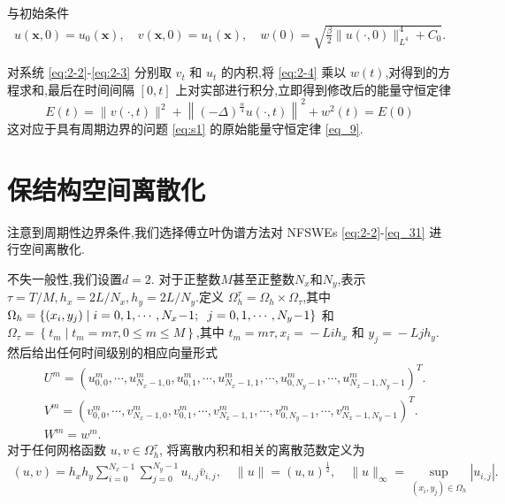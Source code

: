 与初始条件
\begin{align}\label{eq_31}
u(\boldsymbol{x}, 0)=u_{0}(\boldsymbol{x}), \quad v(\boldsymbol{x}, 0)=u_{1}(\boldsymbol{x}), \quad w(0)=\sqrt{\frac{\beta}{2}\|u(\cdot, 0)\|_{L^{4}}^{4} +C_0}.
\end{align}

对系统 \eqref{eq:2-2}-\eqref{eq:2-3} 分别取 $v_t$ 和 $u_t$ 的内积,将 \eqref{eq:2-4} 乘以 $w(t )$,对得到的方程求和,最后在时间间隔 $[0, t]$ 上对实部进行积分,立即得到修改后的能量守恒定律
\begin{equation}
E(t)=\|v(\cdot, t)\|^2+\left\|(-\Delta)^{\frac{\alpha}{4}} u(\cdot, t)\right\|^{2}+w^2(t)=E(0)
\end{equation}
这对应于具有周期边界的问题 \eqref{eq:s1} 的原始能量守恒定律 \eqref{eq_9}.
\section{保结构空间离散化}\label{Section 3}

注意到周期性边界条件,我们选择傅立叶伪谱方法对 NFSWEs \eqref{eq:2-2}-\eqref{eq_31} 进行空间离散化.%

不失一般性,我们设置$d=2$.
对于正整数$M$甚至正整数$N_{x}$和$N_{y}$,表示$\tau={T}/{M},h_{x}={2 L}/{N_{ x}}, h_{y}={2 L}/{N_{y}}$.定义 $\Omega_{h}^{\tau}=\Omega_{h} \times \Omega_{\tau}$,其中 $\Omega_{h}=\left\{\left(x_{i}, y_{ j}\right) \mid i=0,1, \cdots, N_{x}\!-\!1;\right.\\ \left.j=0,1, \cdots, N_{y}\! -\!1\right\}$ 和 $\Omega_{\tau}=\left\{t_{m} \mid t_{m}=m \tau, 0 \leq m \leq M\right\}$,其中 $t_{m}=m \tau, x_{i}\!=\!-L i h_{x}$ 和 $y_{j}\!=\!-L j h_{y}$.
然后给出任何时间级别的相应向量形式
\begin{align}\label{eq_47}
&U^m=\left(u_{0,0}^m, \cdots, u_{N_{x}-1,0}^m, u_{0,1}^m, \cdots, u_{N_{x}-1,1}^m, \cdots, u_{0, N_{y}-1}^m, \cdots, u_{N_{x}-1, N_{y}-1}^m\right)^{T}.\\
&V^m=\left(v_{0,0}^m, \cdots, v_{N_{x}-1,0}^m, v_{0,1}^m, \cdots, v_{N_{x}-1,1}^m, \cdots, v_{0, N_{y}-1}^m, \cdots, v_{N_{x}-1, N_{y}-1}^m\right)^{T}.\\
&W^m=w^m.
\end{align}
对于任何网格函数 $u,v\in \Omega_{h}^{\tau}$,
将离散内积和相关的离散范数定义为
\begin{align}\label{eq_48}
(u, v)=h_{x} h_{y} \sum_{i=0}^{N_{x}-1} \sum_{j=0}^{N_{y}-1} u_{i, j} \bar{v}_{i, j}, \quad\|u\|=(u, u)^{\frac{1}{2}}, \quad\|u\|_{\infty}=\sup _{\left(x_{i}, y_{j}\right) \in \Omega_{h}}\left|u_{i, j}\right|.
\end{align}


